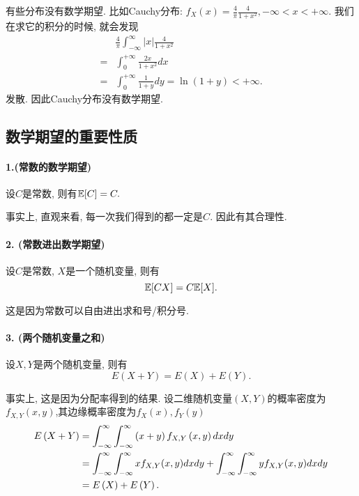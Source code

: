     有些分布没有数学期望. 比如Cauchy分布: $f_X(x)=\frac{4}{\pi} \frac{4}{1+x^2},-\infty<x<+\infty$. 我们在求它的积分的时候, 就会发现
    $$
\begin{aligned}
& \frac{4}{\pi} \int_{-\infty}^{\infty}|x| \frac{4}{1+x^2} \\
= & \int_0^{+\infty} \frac{2 x}{1+x^2} d x \\
= & \int_0^{+\infty} \frac{1}{1+y} d y=\ln (1+y)<+\infty .
\end{aligned}
$$发散. 因此Cauchy分布没有数学期望. 

    \subsection{数学期望的重要性质}
    
    \paragraph{1.(常数的数学期望)} 设$C$是常数, 则有$\mathbb E[C] = C.$

    事实上, 直观来看, 每一次我们得到的都一定是$C$. 因此有其合理性. 

    \paragraph{2. (常数进出数学期望)} 设$C$是常数, $X$是一个随机变量, 则有
    \[
        \mathbb E[CX] = C\mathbb E[X].
    \]
    
    这是因为常数可以自由进出求和号/积分号. 

    \paragraph{3. (两个随机变量之和)}设$X,Y$是两个随机变量, 则有
    \[
        E\left(X+Y\right) = E\left(X\right) + E\left(Y\right).
    \]

    事实上, 这是因为分配率得到的结果. 设二维随机变量$\left(X,Y\right)$的概率密度为$f_{X,Y}\left(x,y\right)$,其边缘概率密度为$f_X(x),f_Y(y)$
    \begin{align}
        E\left(X+Y\right) &= \int_{-\infty}^{\infty}\int_{-\infty}^{\infty}\left(x+y\right)f_{X,Y}\left(x,y\right){d}x{d}y \notag\\
        & =  \int_{-\infty}^{\infty}\int_{-\infty}^{\infty}xf_{X,Y}(x,y){d}x{d}y + \int_{-\infty}^{\infty}\int_{-\infty}^{\infty}yf_{X,Y}(x,y){d}x{d}y \notag\\
        & = E\left(X\right) + E\left(Y\right)\notag.
    \end{align}

